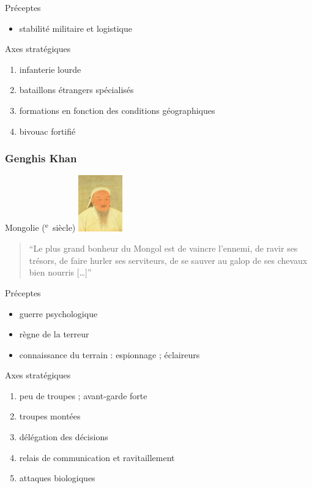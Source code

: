 \documentclass{article}
\newcommand{\cRM}[1]{\MakeUppercase{\romannumeral #1}}  %
\newcommand{\siecle}[1]{\cRM{#1}\textsuperscript{e}~siècle}
\begin{document}
Préceptes
\begin{itemize}
\item stabilité militaire et logistique
\end{itemize}
Axes stratégiques
\begin{enumerate}
\item infanterie lourde
\item bataillons étrangers spécialisés
\item formations en fonction des conditions géographiques
\item bivouac fortifié
\end{enumerate}
\cite{caesar_wiki, caesar_lacks}

\subsubsection{Genghis Khan}
Mongolie (\siecle{12})
\includegraphics[trim=0cm 1cm 0cm 1cm, clip=true, width=1.9cm]{../ressources/genghis_khan}
\begin{quote}“Le plus grand bonheur du Mongol est de vaincre l’ennemi, de ravir ses trésors, de faire hurler ses serviteurs, de se sauver au galop de ses chevaux bien nourris [\ldots]”\end{quote}

Préceptes
\begin{itemize}
\item guerre psychologique
\item règne de la terreur
\item connaissance du terrain : espionnage ; éclaireurs
\end{itemize}
Axes stratégiques
\begin{enumerate}
\item peu de troupes ; avant-garde forte
\item troupes montées %
\item délégation des décisions
\item relais de communication et ravitaillement
\item attaques biologiques
\end{enumerate}
\cite{khan_wiki, military_strategy, mongol_army}
\end{document}

